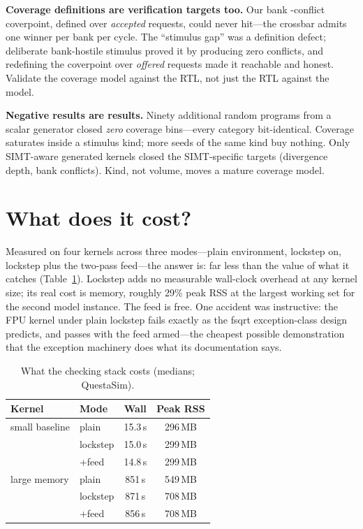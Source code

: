\documentclass[conference]{IEEEtran}
\begin{document}
\textbf{Coverage definitions are verification targets too.} Our bank
-conflict coverpoint, defined over \emph{accepted} requests, could
never hit---the crossbar admits one winner per bank per cycle. The
``stimulus gap'' was a definition defect; deliberate bank-hostile
stimulus proved it by producing zero conflicts, and redefining the
coverpoint over \emph{offered} requests made it reachable and honest.
Validate the coverage model against the RTL, not just the RTL against
the model.

\textbf{Negative results are results.} Ninety additional
random programs from a scalar generator closed \emph{zero} coverage
bins---every category bit-identical. Coverage saturates inside a
stimulus kind; more seeds of the same kind buy nothing. Only
SIMT-aware generated kernels closed the SIMT-specific targets
(divergence depth, bank conflicts). Kind, not volume, moves a mature
coverage model.

\section{What does it cost?}
Measured on four kernels across three modes---plain environment,
lockstep on, lockstep plus the two-pass feed---the answer is: far
less than the value of what it catches (Table~\ref{tab:cost}).
Lockstep adds no measurable wall-clock overhead at any kernel size;
its real cost is memory, roughly 29\% peak RSS at the largest working
set for the second model instance. The feed is free. One accident
was instructive: the FPU kernel under plain lockstep fails exactly as
the fsqrt exception-class design predicts, and passes with the feed
armed---the cheapest possible demonstration that the exception
machinery does what its documentation says.

\begin{table}[t]
	\caption{What the checking stack costs (medians; QuestaSim).}
	\label{tab:cost}
	\centering
	\small
	\begin{tabular}{llcc}
		\toprule
		Kernel         & Mode     & Wall    & Peak RSS \\
		\midrule
		small baseline & plain    & 15.3\,s & 296\,MB  \\
		               & lockstep & 15.0\,s & 299\,MB  \\
		               & +feed    & 14.8\,s & 299\,MB  \\
		large memory   & plain    & 851\,s  & 549\,MB  \\
		               & lockstep & 871\,s  & 708\,MB  \\
		               & +feed    & 856\,s  & 708\,MB  \\
		\bottomrule
	\end{tabular}
\end{table}
\end{document}
